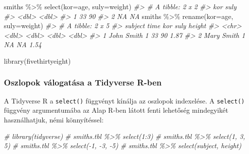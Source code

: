 \documentclass[
]{book}
\newenvironment{Shaded}{\begin{snugshade}}{\end{snugshade}}
\newcommand{\AttributeTok}[1]{\textcolor[rgb]{0.77,0.63,0.00}{#1}}
\newcommand{\CommentTok}[1]{\textcolor[rgb]{0.56,0.35,0.01}{\textit{#1}}}
\newcommand{\FunctionTok}[1]{\textcolor[rgb]{0.00,0.00,0.00}{#1}}
\newcommand{\NormalTok}[1]{#1}
\newcommand{\SpecialCharTok}[1]{\textcolor[rgb]{0.00,0.00,0.00}{#1}}
\begin{document}
\begin{Shaded}
\begin{Highlighting}[]
\NormalTok{smiths }\SpecialCharTok{\%\textgreater{}\%} \FunctionTok{select}\NormalTok{(}\AttributeTok{kor=}\NormalTok{age, }\AttributeTok{suly=}\NormalTok{weight)}
\CommentTok{\#\textgreater{} \# A tibble: 2 x 2}
\CommentTok{\#\textgreater{}     kor  suly}
\CommentTok{\#\textgreater{}   \textless{}dbl\textgreater{} \textless{}dbl\textgreater{}}
\CommentTok{\#\textgreater{} 1    33    90}
\CommentTok{\#\textgreater{} 2    NA    NA}
\NormalTok{smiths }\SpecialCharTok{\%\textgreater{}\%} \FunctionTok{rename}\NormalTok{(}\AttributeTok{kor=}\NormalTok{age, }\AttributeTok{suly=}\NormalTok{weight)}
\CommentTok{\#\textgreater{} \# A tibble: 2 x 5}
\CommentTok{\#\textgreater{}   subject     time   kor  suly height}
\CommentTok{\#\textgreater{}   \textless{}chr\textgreater{}      \textless{}dbl\textgreater{} \textless{}dbl\textgreater{} \textless{}dbl\textgreater{}  \textless{}dbl\textgreater{}}
\CommentTok{\#\textgreater{} 1 John Smith     1    33    90   1.87}
\CommentTok{\#\textgreater{} 2 Mary Smith     1    NA    NA   1.54}
\end{Highlighting}
\end{Shaded}

\begin{Shaded}
\begin{Highlighting}[]
\FunctionTok{library}\NormalTok{(fivethirtyeight)}
\end{Highlighting}
\end{Shaded}

\hypertarget{oszlopok-vuxe1logatuxe1sa-a-tidyverse-r-ben}{%
\subsubsection{Oszlopok válogatása a Tidyverse R-ben}\label{oszlopok-vuxe1logatuxe1sa-a-tidyverse-r-ben}}

A Tidyverse R a \texttt{select()} függvényt kínálja az oszlopok indexelése. A \texttt{select()} függvény argumentumába az Alap R-ben látott fenti lehetőség mindegyikét használhatjuk, némi könnyítéssel:

\begin{Shaded}
\begin{Highlighting}[]
\CommentTok{\# library(tidyverse)}
\CommentTok{\# smiths.tbl \%\textgreater{}\% select(1:3)}
\CommentTok{\# smiths.tbl \%\textgreater{}\% select(1, 3, 5)}
\CommentTok{\# smiths.tbl \%\textgreater{}\% select({-}1, {-}3, {-}5)}
\CommentTok{\# smiths.tbl \%\textgreater{}\% select(subject, height)}
\end{Highlighting}
\end{Shaded}
\end{document}
